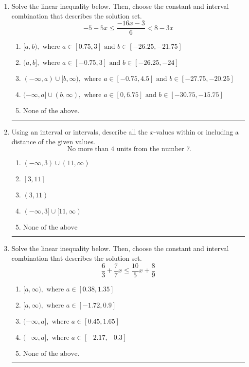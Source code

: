 \documentclass[14pt]{extbook}
\newcommand{\litem}[1]{\item#1\hspace*{-1cm}\rule{\textwidth}{0.4pt}}
\begin{document}
\begin{enumerate}
\litem{
Solve the linear inequality below. Then, choose the constant and interval combination that describes the solution set.\[ -5 - 5 x \leq \frac{-16 x - 3}{6} < 8 - 3 x \]\begin{enumerate}[label=\Alph*.]
\item \( [a, b), \text{ where } a \in [0.75, 3] \text{ and } b \in [-26.25, -21.75] \)
\item \( (a, b], \text{ where } a \in [-0.75, 3] \text{ and } b \in [-26.25, -24] \)
\item \( (-\infty, a) \cup [b, \infty), \text{ where } a \in [-0.75, 4.5] \text{ and } b \in [-27.75, -20.25] \)
\item \( (-\infty, a] \cup (b, \infty), \text{ where } a \in [0, 6.75] \text{ and } b \in [-30.75, -15.75] \)
\item \( \text{None of the above.} \)

\end{enumerate} }
\litem{
Using an interval or intervals, describe all the $x$-values within or including a distance of the given values.\[ \text{ No more than } 4 \text{ units from the number } 7. \]\begin{enumerate}[label=\Alph*.]
\item \( (-\infty, 3) \cup (11, \infty) \)
\item \( [3, 11] \)
\item \( (3, 11) \)
\item \( (-\infty, 3] \cup [11, \infty) \)
\item \( \text{None of the above} \)

\end{enumerate} }
\litem{
Solve the linear inequality below. Then, choose the constant and interval combination that describes the solution set.\[ \frac{6}{3} + \frac{7}{7} x \leq \frac{10}{5} x + \frac{8}{9} \]\begin{enumerate}[label=\Alph*.]
\item \( [a, \infty), \text{ where } a \in [0.38, 1.35] \)
\item \( [a, \infty), \text{ where } a \in [-1.72, 0.9] \)
\item \( (-\infty, a], \text{ where } a \in [0.45, 1.65] \)
\item \( (-\infty, a], \text{ where } a \in [-2.17, -0.3] \)
\item \( \text{None of the above}. \)


\end{enumerate}}
\end{enumerate}
\end{document}
